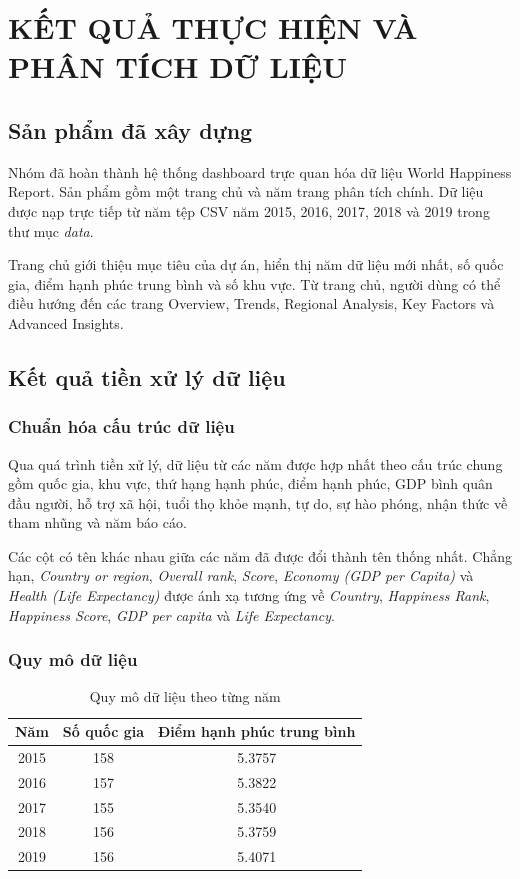 \chapter{KẾT QUẢ THỰC HIỆN VÀ PHÂN TÍCH DỮ LIỆU}

\section{Sản phẩm đã xây dựng}

Nhóm đã hoàn thành hệ thống dashboard trực quan hóa dữ liệu World Happiness Report. Sản phẩm gồm một trang chủ và năm trang phân tích chính. Dữ liệu được nạp trực tiếp từ năm tệp CSV năm 2015, 2016, 2017, 2018 và 2019 trong thư mục \textit{data}.

Trang chủ giới thiệu mục tiêu của dự án, hiển thị năm dữ liệu mới nhất, số quốc gia, điểm hạnh phúc trung bình và số khu vực. Từ trang chủ, người dùng có thể điều hướng đến các trang Overview, Trends, Regional Analysis, Key Factors và Advanced Insights.

\section{Kết quả tiền xử lý dữ liệu}

\subsection{Chuẩn hóa cấu trúc dữ liệu}

Qua quá trình tiền xử lý, dữ liệu từ các năm được hợp nhất theo cấu trúc chung gồm quốc gia, khu vực, thứ hạng hạnh phúc, điểm hạnh phúc, GDP bình quân đầu người, hỗ trợ xã hội, tuổi thọ khỏe mạnh, tự do, sự hào phóng, nhận thức về tham nhũng và năm báo cáo.

Các cột có tên khác nhau giữa các năm đã được đổi thành tên thống nhất. Chẳng hạn, \textit{Country or region}, \textit{Overall rank}, \textit{Score}, \textit{Economy (GDP per Capita)} và \textit{Health (Life Expectancy)} được ánh xạ tương ứng về \textit{Country}, \textit{Happiness Rank}, \textit{Happiness Score}, \textit{GDP per capita} và \textit{Life Expectancy}.

\subsection{Quy mô dữ liệu}

\begin{table}[H]
\centering
\begin{tabular}{|c|c|c|}
\hline
\textbf{Năm} & \textbf{Số quốc gia} & \textbf{Điểm hạnh phúc trung bình} \\
\hline
2015 & 158 & 5.3757 \\
\hline
2016 & 157 & 5.3822 \\
\hline
2017 & 155 & 5.3540 \\
\hline
2018 & 156 & 5.3759 \\
\hline
2019 & 156 & 5.4071 \\
\hline
\end{tabular}
\caption{Quy mô dữ liệu theo từng năm}
\label{tab:quy-mo-du-lieu}
\end{table}

